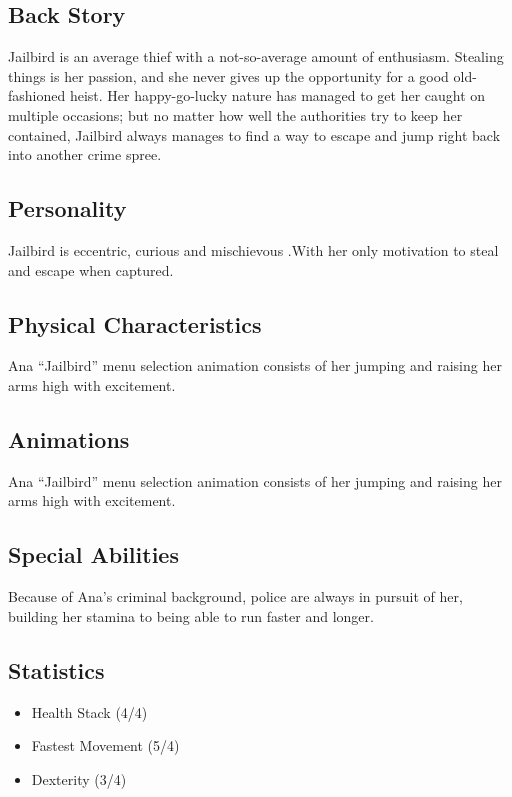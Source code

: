 \documentclass[11pt]{report}
\begin{document}
\subsection{Back Story}

Jailbird is an average thief with a not-so-average amount of enthusiasm. Stealing things is her passion, and she never gives up the opportunity for a good old-fashioned heist. Her happy-go-lucky nature has managed to get her caught on multiple occasions; but no matter how well the authorities try to keep her contained, Jailbird always manages to find a way to escape and jump right back into another crime spree.

\subsection{Personality}

Jailbird is eccentric, curious and mischievous .With her only motivation to steal and escape when captured.

\subsection{Physical Characteristics}

Ana “Jailbird” menu selection animation consists of her jumping and raising her arms high with excitement.

\subsection{Animations}

Ana “Jailbird” menu selection animation consists of her jumping and raising her arms high with excitement.

\subsection{Special Abilities}

Because of Ana’s criminal background, police are always in pursuit of her, building her stamina to being able to run faster and longer.

\subsection{Statistics}

\begin{itemize}
    \item Health Stack (4/4)
    \item Fastest Movement (5/4)
    \item Dexterity (3/4)
\end{itemize}
\end{document}
